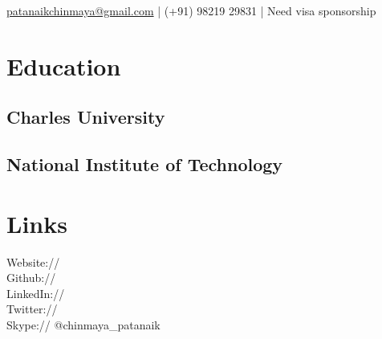 \documentclass[]{deedy-resume-openfont}
\begin{document}
%
%


{ \href{mailto:patanaikchinmaya@gmail.com}{patanaikchinmaya@gmail.com} | (+91) 98219 29831 | Need visa sponsorship
}

%
%

\begin{minipage}[t]{0.33\textwidth}


\section{Education}

\subsection{Charles University}
\sectionsep

\subsection{National Institute of Technology}
\sectionsep


\section{Links}
Website:// \href{http://www.chinmayapatanaik.com}{} \\
Github:// \href{https://github.com/pattu777}{} \\
LinkedIn://  \href{https://cz.linkedin.com/in/chinmayakrpatanaik}{} \\
Twitter://  \href{https://twitter.com/CPatanaik}{} \\
Skype://  @chinmaya\_patanaik
\sectionsep



\end{minipage}
\end{document}
